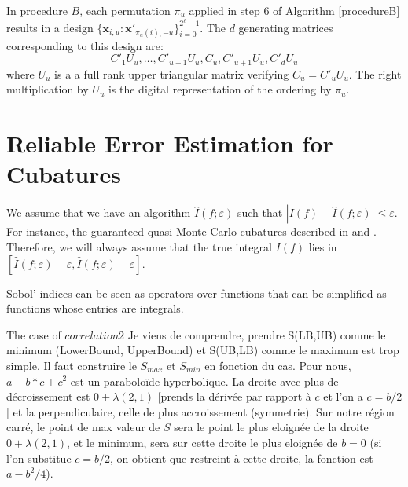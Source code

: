 \documentclass[]{elsarticle}
\theoremstyle{definition}
\newcommand{\bvec}[1]{\boldsymbol{#1}}
\newcommand{\vx}{\bvec{x}}
\def\abs#1{\ensuremath{\left \lvert #1 \right \rvert}}
\begin{document}
In procedure $B$, each permutation $\pi_u$ applied in step $6$ of Algorithm \ref{procedureB} results in a design $\{\vx_{i,u}:{\vx'}_{\pi_u(i),-u}\}_{i=0}^{2^\ell-1}$. The $d$ generating matrices corresponding to this design are:
$${C'}_1U_u,\dots,{C'}_{u-1}U_u,C_u,{C'}_{u+1}U_u,{C'}_dU_u$$ where $U_u$ is a a full rank upper triangular matrix verifying $C_u={C'}_uU_u$. The right multiplication by $U_u$ is the digital representation of the ordering by $\pi_u$. 


\section{Reliable Error Estimation for Cubatures}
\label{section.error} 
We assume that we have an algorithm $\widehat{I}(f;\varepsilon)$ such that $\abs{I(f)-\widehat{I}(f;\varepsilon)}\leq \varepsilon$. For instance, the guaranteed quasi-Monte Carlo cubatures described in \cite{-} and \cite{-}. Therefore, we will always assume that the true integral $I(f)$ lies in $[\widehat{I}(f;\varepsilon)-\varepsilon,\widehat{I}(f;\varepsilon)+\varepsilon]$.

Sobol' indices can be seen as operators over functions that can be simplified as functions whose entries are integrals.

The case of $correlation 2$
Je viens de comprendre, prendre S(LB,UB) comme le minimum (LowerBound, UpperBound) et S(UB,LB) comme le maximum est trop simple. Il faut construire le $S_{max}$ et $S_{min}$ en fonction du cas.
Pour nous, $a - b*c + c^2$ est un paraboloïde hyperbolique. La droite avec plus de décroissement est $0+\lambda(2,1)$ [prends la dérivée par rapport à $c$ et l'on a $c=b/2$] et la perpendiculaire, celle de plus accroissement (symmetrie). Sur notre région carré, le point de max valeur de $S$ sera le point le plus eloignée de la droite $0+\lambda(2,1)$, et le minimum, sera sur cette droite le plus eloignée de $b = 0$ (si l'on substitue $c=b/2$, on obtient que restreint à cette droite, la fonction est $a-b^2/4$).
\end{document}
